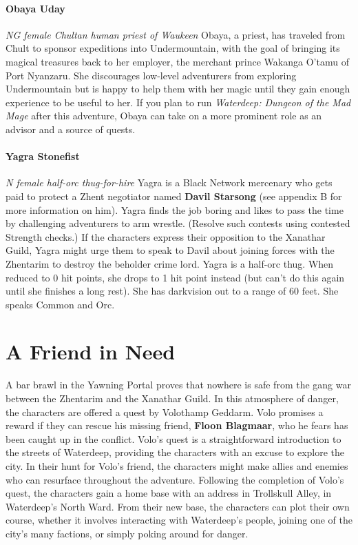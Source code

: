 \documentclass[10pt,a4paper,twoside,twocolumn,openany,nodeprecatedcode]{dndbook}
\begin{document}
\subsubsection{Obaya Uday}
\textit{NG female Chultan human priest of Waukeen}
Obaya, a priest, has traveled from Chult to sponsor expeditions into Undermountain, with the goal of bringing its magical treasures back to her employer, the merchant prince Wakanga O'tamu of Port Nyanzaru. She discourages low-level adventurers from exploring Undermountain but is happy to help them with her magic until they gain enough experience to be useful to her.
If you plan to run \textit{Waterdeep: Dungeon of the Mad Mage} after this adventure, Obaya can take on a more prominent role as an advisor and a source of quests.
\subsubsection{Yagra Stonefist}
\textit{N female half-orc thug-for-hire}
Yagra is a Black Network mercenary who gets paid to protect a Zhent negotiator named \textbf{Davil Starsong} (see appendix B for more information on him). Yagra finds the job boring and likes to pass the time by challenging adventurers to arm wrestle. (Resolve such contests using contested Strength checks.) If the characters express their opposition to the Xanathar Guild, Yagra might urge them to speak to Davil about joining forces with the Zhentarim to destroy the beholder crime lord.
Yagra is a half-orc thug. When reduced to 0 hit points, she drops to 1 hit point instead (but can't do this again until she finishes a long rest). She has darkvision out to a range of 60 feet. She speaks Common and Orc.
\chapter{A Friend in Need}
A bar brawl in the Yawning Portal proves that nowhere is safe from the gang war between the Zhentarim and the Xanathar Guild. In this atmosphere of danger, the characters are offered a quest by Volothamp Geddarm. Volo promises a reward if they can rescue his missing friend, \textbf{Floon Blagmaar}, who he fears has been caught up in the conflict. Volo's quest is a straightforward introduction to the streets of Waterdeep, providing the characters with an excuse to explore the city.
In their hunt for Volo's friend, the characters might make allies and enemies who can resurface throughout the adventure. Following the completion of Volo's quest, the characters gain a home base with an address in Trollskull Alley, in Waterdeep's North Ward. From their new base, the characters can plot their own course, whether it involves interacting with Waterdeep's people, joining one of the city's many factions, or simply poking around for danger.
\end{document}
